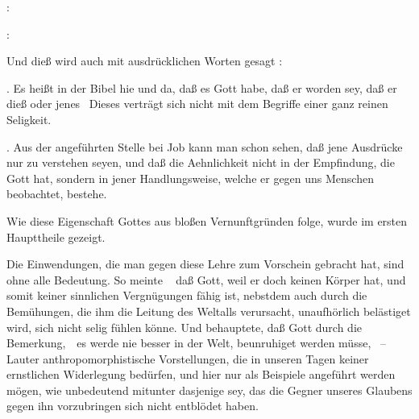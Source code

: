 \begin{aufza}
\item {}:\par
{}
\item {}: 
\item Und dieß wird auch mit ausdrücklichen Worten gesagt : 
\end{aufza}\par
{}. Es heißt in der Bibel hie und da, daß es Gott  habe, daß er  worden sey, daß er dieß oder jenes  \udgl\  Dieses verträgt sich nicht mit dem Begriffe einer ganz reinen Seligkeit.\par
{}. Aus der angeführten Stelle bei Job kann man schon sehen, daß jene Ausdrücke nur  zu verstehen seyen, und daß die Aehnlichkeit nicht in der Empfindung, die Gott hat, sondern in jener Handlungsweise, welche er gegen uns Menschen beobachtet, bestehe.

Wie diese Eigenschaft Gottes aus bloßen Vernunftgründen folge, wurde im ersten Haupttheile gezeigt.

\begin{RWanm} 
Die Einwendungen, die man gegen diese Lehre zum Vorschein gebracht hat, sind ohne alle Bedeutung. So meinte \zB\  daß Gott, weil er doch keinen Körper hat, und somit keiner sinnlichen Vergnügungen fähig ist, nebstdem auch durch die Bemühungen, die ihm die Leitung des Weltalls verursacht, unaufhörlich belästiget wird, sich nicht selig fühlen könne. Und  behauptete, daß Gott durch die Bemerkung,~\ es werde nie besser in der Welt, beunruhiget werden müsse, \udgl\  -- Lauter anthropomorphistische Vorstellungen, die in unseren Tagen keiner ernstlichen Widerlegung bedürfen, und hier nur als Beispiele angeführt werden mögen, wie unbedeutend mitunter dasjenige sey, das die Gegner unseres Glaubens gegen ihn vorzubringen sich nicht entblödet haben.
\end{RWanm}

